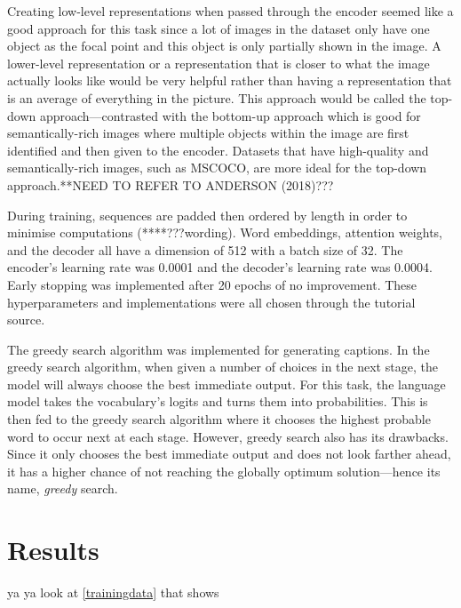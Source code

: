 \documentclass[11pt,a4paper]{article}
\begin{document}
Creating low-level representations when passed through the encoder seemed like a good approach for this task since a lot of images in the dataset only have one object as the focal point and this object is only partially shown in the image. A lower-level representation or a representation that is closer to what the image actually looks like would be very helpful rather than having a representation that is an average of everything in the picture. This approach would be called the top-down approach—contrasted with the bottom-up approach which is good for semantically-rich images where multiple objects within the image are first identified and then given to the encoder. Datasets that have high-quality and semantically-rich images, such as MSCOCO, are more ideal for the top-down approach.**NEED TO REFER TO ANDERSON (2018)??? 

During training, sequences are padded then ordered by length in order to minimise computations (****???wording). Word embeddings, attention weights, and the decoder all have a dimension of 512 with a batch size of 32. The encoder’s learning rate was 0.0001 and the decoder’s learning rate was 0.0004. Early stopping was implemented after 20 epochs of no improvement. These hyperparameters and implementations were all chosen through the tutorial source.  

The greedy search algorithm was implemented for generating captions. In the greedy search algorithm, when given a number of choices in the next stage, the model will always choose the best immediate output. For this task, the language model takes the vocabulary’s logits and turns them into probabilities. This is then fed to the greedy search algorithm where it chooses the highest probable word to occur next at each stage. However, greedy search also has its drawbacks. Since it only chooses the best immediate output and does not look farther ahead, it has a higher chance of not reaching the globally optimum solution—hence its name, \emph{greedy} search.

\section{Results}
\label{sec:results}
ya ya look at  \autoref{trainingdata} that shows
\end{document}
